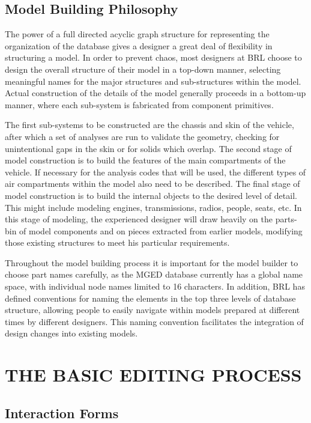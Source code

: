 \section{Model Building Philosophy}

The power of a full directed acyclic graph structure for representing
the organization of the database gives a designer a great deal of
flexibility in structuring a model.
In order to prevent chaos, most designers at BRL choose to
design the overall structure of their model in a top-down manner,
selecting meaningful names for the major structures and sub-structures
within the model.
Actual construction of the details of the 
model generally proceeds in a bottom-up
manner, where each sub-system is fabricated from component primitives.

The first sub-systems to be constructed are the chassis and skin of the
vehicle, after which a set of analyses are run to validate the geometry,
checking for unintentional gaps in the skin or for solids which overlap.
The second stage of model construction is to build the features of the
main compartments of the vehicle.  If necessary for the analysis
codes that will be used, the different types of air compartments within
the model also need to be described.
The final stage of model construction is to build the internal
objects to the desired level of detail.
This might include modeling engines, transmissions, radios,
people, seats, etc.
In this stage of modeling, the experienced designer will draw heavily on the
parts-bin of model components and on pieces extracted from earlier
models, modifying those existing structures to meet his particular
requirements.

Throughout the model building process it is important for the model builder
to choose part names carefully, as the MGED database currently has a
global name space, with individual node names limited to 16 characters.
In addition, BRL has defined conventions for naming the elements in the
top three levels of database structure,
allowing people to
easily navigate within models prepared at
different times by different designers.
This naming convention
facilitates the integration of design changes into existing models.

\chapter{THE BASIC EDITING PROCESS}

\section{Interaction Forms}

